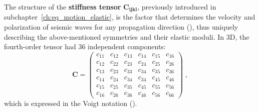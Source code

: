 The structure of the \textbf{stiffness tensor} $\mathbf{C_{ijkl}}$, previously introduced in subchapter~\ref{ch:eq_motion_elastic}, is the factor that determines the velocity and polarization of seismic waves for any propagation direction (\cite{Tsvankin:12}), thus uniquely describing the above-mentioned symmetries and their elastic moduli. In 3D, the fourth-order tensor had 36 independent components:
\begin{equation}
    \mathbf{C} = 
    \begin{pmatrix}
    c_{11} & c_{12} & c_{13} & c_{14} & c_{15} & c_{16} \\
    c_{12} & c_{22} & c_{23} & c_{24} & c_{25} & c_{26} \\
    c_{13} & c_{23} & c_{33} & c_{34} & c_{35} & c_{36} \\
    c_{14} & c_{24} & c_{34} & c_{34} & c_{45} & c_{46} \\
    c_{15} & c_{25} & c_{35} & c_{45} & c_{55} & c_{56} \\
    c_{16} & c_{26} & c_{36} & c_{46} & c_{56} & c_{66} 
    \end{pmatrix}\;,
    \label{eq:voigt_C}
\end{equation}
which is expressed in the Voigt notation (\cite{Voigt:10}).

